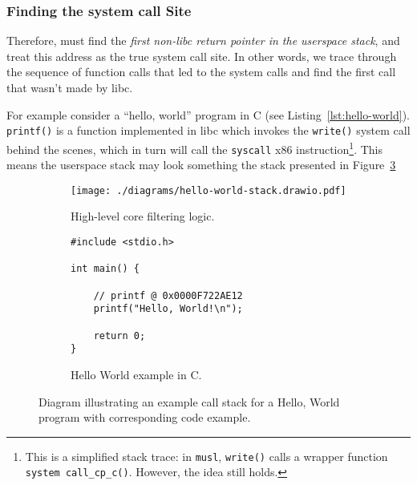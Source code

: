 \subsubsection{Finding the system call Site}\label{subsubsec:find_syscall}

Therefore, \af must find the \textit{first non-\ac{libc} return pointer in the
userspace stack}, and treat this address as the true system call site. In other
words, we trace through the sequence of function calls that led to the system
calls and find the first call that wasn't made by libc.

For example consider a ``hello, world'' program in C (see Listing~\ref{lst:hello-world}). \texttt{printf()} is a 
function implemented in \ac{libc} which invokes the \texttt{write()} system call
behind the scenes, which in turn will call the \texttt{syscall} x86
instruction\footnote{This is a simplified stack trace: in \texttt{musl},
\texttt{write()} calls a wrapper function \texttt{system call\_cp\_c()}. However,
the idea still holds.}. This means the userspace stack may look something the stack
presented in Figure~\ref{fig:hello-world-stack}

\begin{figure}[h]
    \centering %

    \begin{subfigure}[b]{0.48\linewidth} %
        \centering %
        \texttt{[image: ./diagrams/hello-world-stack.drawio.pdf]}
        \caption{High-level \afg core filtering logic.} %
        \label{subfig:stack-diagram} %
    \end{subfigure}
    \hfill %
    \begin{subfigure}[b]{0.48\linewidth} %
        \centering %
        \begin{verbatim}
#include <stdio.h>

int main() {

    // printf @ 0x0000F722AE12
    printf("Hello, World!\n");    

    return 0;
}
        \end{verbatim}
        \caption{Hello World example in C.} %
        \label{subfig:hello-world-code} %
    \end{subfigure}

    \caption{Diagram illustrating an example call stack for a Hello, World
    program with corresponding code example.}%
    \label{fig:hello-world-stack} %

\end{figure}

